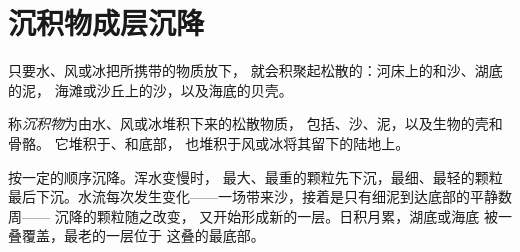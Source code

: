 \section{沉积物成层沉降}

只要水、风或冰把所携带的物质放下，
就会积聚起松散的：河床上的和沙、湖底的泥，
海滩或沙丘上的沙，以及海底的贝壳。

\begin{definition}[沉积物]\label{def:g7:sediments-and-fossils:sediment}
称\emph{沉积物}为由水、风或冰堆积下来的松散物质，
包括、沙、泥，以及生物的壳和骨骼。
它堆积于、和底部，
也堆积于风或冰将其留下的陆地上。
\end{definition}

按一定的顺序沉降。浑水变慢时，
最大、最重的颗粒先下沉，最细、最轻的颗粒
最后下沉。水流每次发生变化——一场带来沙，接着是只有细泥到达底部的平静数周——
沉降的颗粒随之改变，
又开始形成新的一层。日积月累，湖底或海底
被一叠覆盖，最老的一层位于
这叠的最底部。

